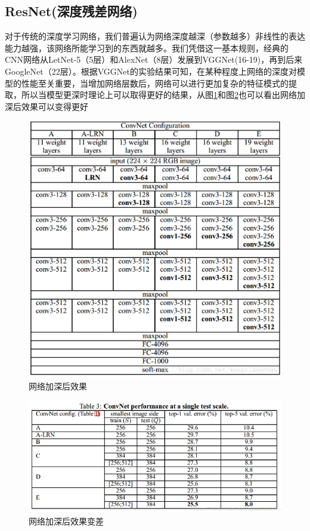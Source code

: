 \subsection{ResNet(深度残差网络)}\label{resnetux6df1ux5ea6ux6b8bux5deeux7f51ux7edc}

对于传统的深度学习网络，我们普遍认为网络深度越深（参数越多）非线性的表达能力越强，该网络所能学习到的东西就越多。我们凭借这一基本规则，经典的CNN网络从LetNet-5（5层）和AlexNet（8层）发展到VGGNet(16-19)，再到后来GoogleNet（22层）。根据VGGNet的实验结果可知，在某种程度上网络的深度对模型的性能至关重要，当增加网络层数后，网络可以进行更加复杂的特征模式的提取，所以当模型更深时理论上可以取得更好的结果，从图\ref{fig::theory7}和图\ref{fig::theory8}也可以看出网络加深后效果可以变得更好

\begin{figure}[htbp]
\centering
\includegraphics[width=0.8\linewidth]{body/theory_pic/resnet1}
\caption{网络加深后效果}
\label{fig::theory7}
\end{figure}

\begin{figure}[htbp]
\centering
\includegraphics[width=0.8\linewidth]{body/theory_pic/resnet2}
\caption{网络加深后效果变差}
\label{fig::theory8}
\end{figure}

